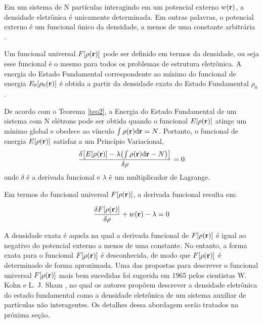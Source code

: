 \begin{teo}\label{teo1}
	Em um sistema de N partículas interagindo em um potencial externo $ w(\vb{r}) $, a densidade eletrônica é unicamente determinada. Em outras palavras, o potencial externo é um funcional único da densidade, a menos de uma constante arbitrária .
\end{teo}

\begin{teo}\label{teo2}
	Um funcional universal $ F\bqty{\dens} $ pode ser definido em termos da densidade, ou seja esse funcional é o mesmo para todos os problemas de estrutura eletrônica. A energia do Estado Fundamental correspondente ao mínimo do funcional de energia $ E_0\bqty{\denzero} $ é obtida a partir da densidade exata do Estado Fundamental $ \rho_0 $ \cite{abc_dft}.
\end{teo}

De acordo com o Teorema \ref{teo2}, a Energia do Estado Fundamental de um sistema com N elétrons pode ser obtida quando o funcional $ E[\rho(\vb{r})] $ atinge um mínimo global e obedece ao vínculo $ \int \rho(\vb{r})\dd\vb{r} =N$. Portanto, o funcional de energia $  E[\rho(\vb{r})] $ satisfaz a um Princípio Variacional,
\begin{equation}\label{eq:dev_funcional}
	\fdv{\bqty{ E[\dens]-\lambda\pqty{\int \dens\dd\vb{r} -N}}}{\rho}=0
\end{equation}
 onde $ \delta $ é a derivada funcional e $ \lambda $ é um multiplicador de Lagrange.



Em termos do funcional universal $ F\bqty{\dens} $, a derivada funcional resulta em:

\begin{equation}\label{eq:derivada_funcional}
	\fdv{F\bqty{\dens}}{\rho}+w(\vb{r})-\lambda=0
\end{equation}

A densidade exata é aquela na qual a derivada funcional de $ F\bqty{\dens} $ é igual ao negativo do potencial externo a menos de uma constante. No entanto, a forma exata para o funcional $ F\bqty{\dens} $ é desconhecida, de modo que $ F\bqty{\dens}  $ é determinado de forma aproximada. Uma das propostas para descrever o funcional universal $ F\bqty{\dens} $ mais bem sucedidas foi sugerida em 1965 pelos cientistas W. Kohn e L. J. Sham \cite{kohn_sham}, no qual os autores propõem descrever a densidade eletrônica do estado fundamental como a densidade eletrônica de um sistema auxiliar de partículas não interagentes. Os detalhes dessa abordagem serão tratados na próxima seção.

